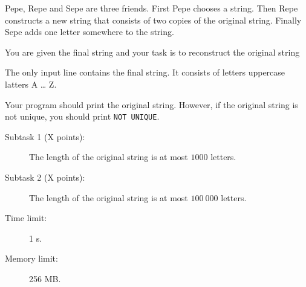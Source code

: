 \documentclass{boi2014}
\begin{document}
    Pepe, Repe and Sepe are three friends. First Pepe chooses a string. Then
    Repe constructs a new string that consists of two copies of the original
    string. Finally Sepe adds one letter somewhere to the string.
    

    \Task
    You are given the final string and your task is to reconstruct the original
    string

    \Input
    The only input line contains the final string. It consists of letters
    uppercase latters A \ldots{} Z.

    \Output
    Your program should print the original string. However, if the original
    string is not unique, you should print {\tt NOT UNIQUE}.
    

    \Examples


    \Scoring

    \begin{description}
        \item[Subtask 1 (X points):] The length of the original string is at
        most $1000$ letters.
        \item[Subtask 2 (X points):] The length of the original string is at
        most $100\ 000$ letters.
    \end{description}

    \Constraints

    \begin{description}
        \item[Time limit:] 1 s.
        \item[Memory limit:] 256 MB.
    \end{description}
\end{document}
